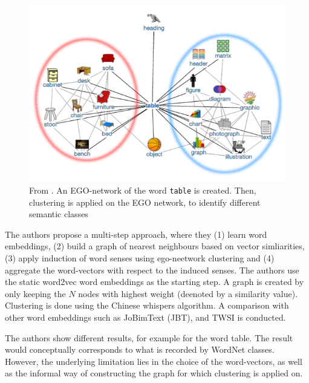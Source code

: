 \documentclass[a4paper,12pt,twoside,openright]{report}
\begin{document}
\begin{figure}[h]
	\center
  \includegraphics[width=0.6\linewidth]{./assets/relatedwork/ego_network.png}
  \caption{From \cite{pelevina16}. An EGO-network of the word \texttt{table} is created. Then, clustering is applied on the EGO network, to identify different semantic classes}
  \label{fig:ego_network}
\end{figure}

The authors propose a multi-step approach, where they (1) learn word embeddings, (2) build a graph of nearest neighbours based on vector simliarities, (3) apply induction of word senses using ego-neetwork clustering and (4) aggregate the word-vectors with respect to the induced senses.
The authors use the static word2vec word embeddings as the starting step.
A graph is created by only keeping the $N$ nodes with highest weight (deenoted by a similarity value).
Clustering is done using the Chinese whispers algorithm.
A comparison with other word embeddings such as JoBimText (JBT), and TWSI is conducted.


The authors show different results, for example for the word table. 
The result would conceptually corresponds to what is recorded by WordNet classes.
However, the underlying limitation lies in the choice of the word-vectors, as well as the informal way of constructing the graph for which clustering is applied on.
\end{document}
